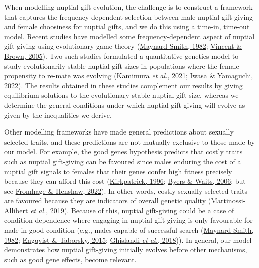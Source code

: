 \documentclass[
]{article}
\begin{document}
When modelling nuptial gift evolution, the challenge is to construct a
framework that captures the frequency-dependent selection between male
nuptial gift-giving and female choosiness for nuptial gifts, and we do
this using a time-in, time-out model. Recent studies have modelled some
frequency-dependent aspect of nuptial gift giving using evolutionary
game theory (\protect\hyperlink{ref-MaynardSmith1982}{Maynard Smith,
1982}; \protect\hyperlink{ref-Vincent2005}{Vincent \& Brown, 2005}). Two
such studies formulated a quantitative genetics model to study
evolutionarily stable nuptial gift sizes in populations where the female
propensity to re-mate was evolving
(\protect\hyperlink{ref-Kamimura2021}{Kamimura \emph{et al.}, 2021};
\protect\hyperlink{ref-Iwasa2022}{Iwasa \& Yamaguchi, 2022}). The
results obtained in these studies complement our results by giving
equilibrium solutions to the evolutionary stable nuptial gift size,
whereas we determine the general conditions under which nuptial
gift-giving will evolve as given by the inequalities we derive.

Other modelling frameworks have made general predictions about sexually
selected traits, and these predictions are not mutually exclusive to
those made by our model. For example, the good genes hypothesis predicts
that costly traits such as nuptial gift-giving can be favoured since
males enduring the cost of a nuptial gift signals to females that their
genes confer high fitness precisely because they can afford this cost
(\protect\hyperlink{ref-Kirkpatrick1996}{Kirkpatrick, 1996};
\protect\hyperlink{ref-Byers2006}{Byers \& Waits, 2006}; but see
\protect\hyperlink{ref-Fromhage2022}{Fromhage \& Henshaw, 2022}). In
other words, costly sexually selected traits are favoured because they
are indicators of overall genetic quality
(\protect\hyperlink{ref-Martinossi-Allibert2019}{Martinossi-Allibert
\emph{et al.}, 2019}). Because of this, nuptial gift-giving could be a
case of condition-dependence where engaging in nuptial gift-giving is
only favourable for male in good condition (e.g., males capable of
successful search (\protect\hyperlink{ref-MaynardSmith1982}{Maynard
Smith, 1982}; \protect\hyperlink{ref-Engqvist2015}{Engqvist \& Taborsky,
2015}; \protect\hyperlink{ref-Ghislandi2018}{Ghislandi \emph{et al.},
2018})). In general, our model demonstrates how nuptial gift-giving
initially evolves before other mechanisms, such as good gene effects,
become relevant.
\end{document}
